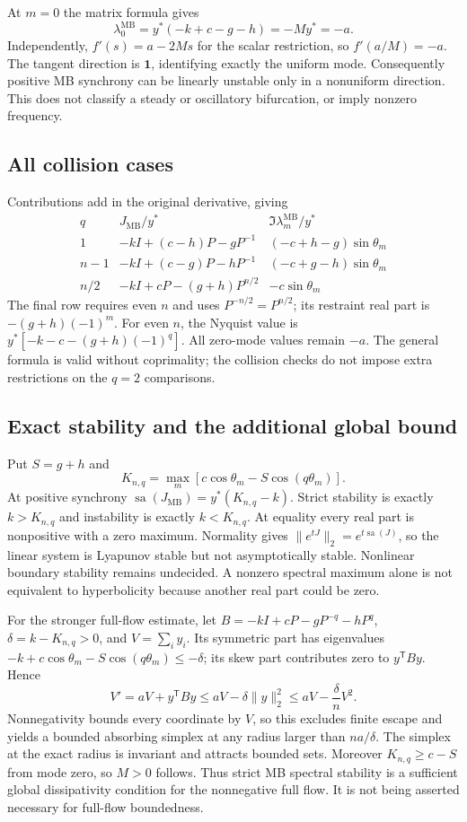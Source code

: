 \documentclass[11pt]{article}
\newcommand{\one}{\mathbf 1}
\newcommand{\MB}{\mathrm{MB}}
\newcommand{\sa}{\operatorname{sa}}
\begin{document}
At $m=0$ the matrix formula gives
\[
 \lambda_0^{\MB}=y^*(-k+c-g-h)=-My^*=-a.
\]
Independently, $f'(s)=a-2Ms$ for the scalar restriction, so
$f'(a/M)=-a$. The tangent direction is $\one$, identifying exactly
the uniform mode. Consequently positive MB synchrony can be linearly
unstable only in a nonuniform direction. This does not classify a
steady or oscillatory bifurcation, or imply nonzero frequency.

\subsection{All collision cases}
Contributions add in the original derivative, giving
\[
\begin{array}{c|l|l}
q&J_{\MB}/y^*&\Im\lambda_m^{\MB}/y^*\\\hline
1&-kI+(c-h)P-gP^{-1}&(-c+h-g)\sin\theta_m\\
n-1&-kI+(c-g)P-hP^{-1}&(-c+g-h)\sin\theta_m\\
n/2&-kI+cP-(g+h)P^{n/2}&-c\sin\theta_m
\end{array}
\]
The final row requires even $n$ and uses $P^{-n/2}=P^{n/2}$;
its restraint real part is $-(g+h)(-1)^m$. For even $n$, the Nyquist
value is $y^*[-k-c-(g+h)(-1)^q]$. All zero-mode values remain $-a$.
The general formula is valid without coprimality; the collision checks
do not impose extra restrictions on the $q=2$ comparisons.

\subsection{Exact stability and the additional global bound}
Put $S=g+h$ and
\[
 K_{n,q}=\max_m[c\cos\theta_m-S\cos(q\theta_m)].
\]
At positive synchrony $\sa(J_{\MB})=y^*(K_{n,q}-k)$. Strict stability
is exactly $k>K_{n,q}$ and instability is exactly $k<K_{n,q}$.
At equality every real part is nonpositive with a zero maximum.
Normality gives $\|e^{tJ}\|_2=e^{t\sa(J)}$, so the linear system is
Lyapunov stable but not asymptotically stable. Nonlinear boundary
stability remains undecided. A nonzero spectral maximum alone is not
equivalent to hyperbolicity because another real part could be zero.

For the stronger full-flow estimate, let $B=-kI+cP-gP^{-q}-hP^q$,
$\delta=k-K_{n,q}>0$, and $V=\sum_i y_i$. Its symmetric part has
eigenvalues $-k+c\cos\theta_m-S\cos(q\theta_m)\le-\delta$; its
skew part contributes zero to $y^{\mathsf T}By$. Hence
\[
 V'=aV+y^{\mathsf T}By\le aV-\delta\|y\|_2^2
                        \le aV-\frac\delta n V^2.
\]
Nonnegativity bounds every coordinate by $V$, so this excludes finite
escape and yields a bounded absorbing simplex at any radius larger than
$na/\delta$. The simplex at the exact radius is invariant and attracts
bounded sets. Moreover $K_{n,q}\ge c-S$ from mode zero, so $M>0$ follows.
Thus strict MB spectral stability is a sufficient global dissipativity
condition for the nonnegative full flow. It is not being asserted
necessary for full-flow boundedness.
\end{document}

